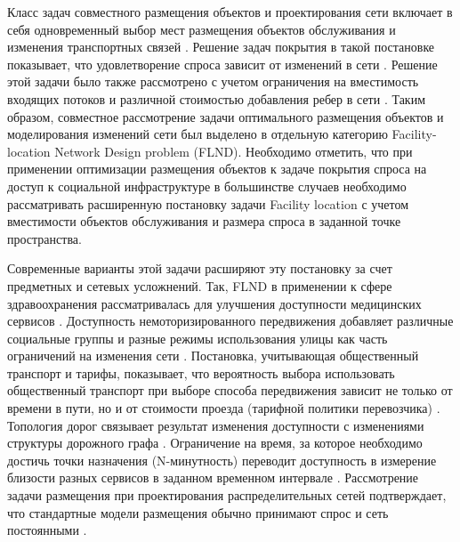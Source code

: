 Класс задач совместного размещения объектов и проектирования сети включает в себя одновременный выбор мест размещения объектов обслуживания и изменения транспортных связей  \cite{daskin1993towardIntegrated} \cite{melkote1996integrated}. Решение задач покрытия в такой постановке показывает, что удовлетворение спроса зависит от изменений в сети \cite{melkote1998maximumCovering}. Решение этой задачи было также рассмотрено с учетом ограничения на вместимость входящих потоков и различной стоимостью добавления ребер в сети \cite{melkote2000capacitated}. Таким образом, совместное рассмотрение задачи оптимального размещения объектов и моделирования изменений сети был выделено в отдельную категорию Facility-location Network Design problem (FLND)\cite{melkote2001integrated}. Необходимо отметить, что при применении оптимизации размещения объектов к задаче покрытия спроса на доступ к социальной инфраструктуре в большинстве случаев необходимо рассматривать расширенную постановку задачи Facility location с учетом вместимости объектов обслуживания и размера спроса в заданной точке пространства.

Современные варианты этой задачи расширяют эту постановку за счет предметных и сетевых усложнений. Так, FLND в применении к сфере здравоохранения рассматривалась для улучшения доступности медицинских сервисов \cite{pourrezaie2022healthcareFlnd}. Доступность немоторизированного передвижения добавляет различные социальные группы и разные режимы использования улицы как часть ограничений на изменения сети \cite{starita2024nonmotorized}. Постановка, учитывающая общественный транспорт и тарифы, показывает, что вероятность выбора использовать общественный транспорт при выборе способа передвижения зависит не только от времени в пути, но и от стоимости проезда (тарифной политики перевозчика) \cite{sugama2024transitFare}. Топология дорог связывает результат изменения доступности с изменениями структуры дорожного графа \cite{zhou2025roadTopology}. Ограничение на время, за которое необходимо достичь точки назначения (N-минутность) переводит доступность в измерение близости разных сервисов в заданном временном интервале \cite{droin2026xminuteness}. Рассмотрение задачи размещения при проектирования распределительных сетей подтверждает, что стандартные модели размещения обычно принимают спрос и сеть постоянными \cite{dybskaya2017distribution}.

